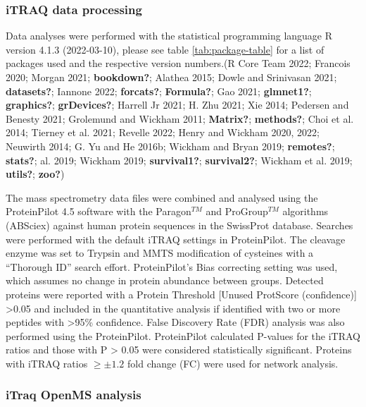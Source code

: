 \documentclass[9pt,lineno]{elife}
\begin{document}
\hypertarget{itraq-stats}{%
\subsubsection{iTRAQ data processing}\label{itraq-stats}}

Data analyses were performed with the statistical programming language R version 4.1.3 (2022-03-10), please see table \ref{tab:package-table} for a list of packages used and the respective version numbers.(R Core Team 2022; Francois 2020; Morgan 2021; \textbf{bookdown?}; Alathea 2015; Dowle and Srinivasan 2021; \textbf{datasets?}; Iannone 2022; \textbf{forcats?}; \textbf{Formula?}; Gao 2021; \textbf{glmnet1?}; \textbf{graphics?}; \textbf{grDevices?}; Harrell Jr 2021; H. Zhu 2021; Xie 2014; Pedersen and Benesty 2021; Grolemund and Wickham 2011; \textbf{Matrix?}; \textbf{methods?}; Choi et al. 2014; Tierney et al. 2021; Revelle 2022; Henry and Wickham 2020, 2022; Neuwirth 2014; G. Yu and He 2016b; Wickham and Bryan 2019; \textbf{remotes?}; \textbf{stats?}; al. 2019; Wickham 2019; \textbf{survival1?}; \textbf{survival2?}; Wickham et al. 2019; \textbf{utils?}; \textbf{zoo?})

The mass spectrometry data files were combined and analysed using the ProteinPilot 4.5 software with the Paragon\(^{TM}\) and ProGroup\(^{TM}\) algorithms (ABSciex) against human protein sequences in the SwissProt database.
Searches were performed with the default iTRAQ settings in ProteinPilot.
The cleavage enzyme was set to Trypsin and MMTS modification of cysteines with a ``Thorough ID'' search effort.
ProteinPilot's Bias correcting setting was used, which assumes no change in protein abundance between groups.
Detected proteins were reported with a Protein Threshold {[}Unused ProtScore (confidence){]} \textgreater0.05 and included in the quantitative analysis if identified with two or more peptides with \textgreater95\% confidence.
False Discovery Rate (FDR) analysis was also performed using the ProteinPilot.
ProteinPilot calculated P-values for the iTRAQ ratios and those with P \textgreater{} 0.05 were considered statistically significant.
Proteins with iTRAQ ratios \(\ge\pm1.2\) fold change (FC) were used for network analysis.

\hypertarget{openms-chap3}{%
\subsubsection{iTraq OpenMS analysis}\label{openms-chap3}}
\end{document}
